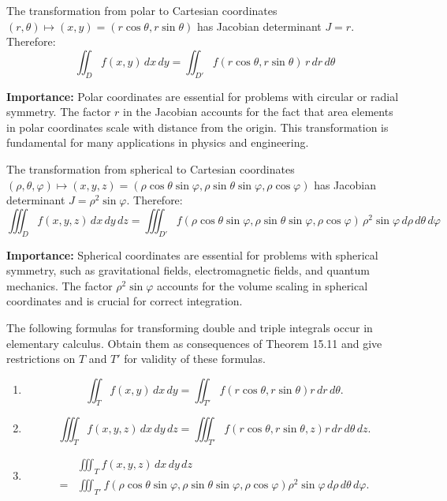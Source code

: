\begin{theorem}
The transformation from polar to Cartesian coordinates $(r, \theta) \mapsto (x, y) = (r\cos\theta, r\sin\theta)$ has Jacobian determinant $J = r$. Therefore:
\[\iint_D f(x, y) \, dx \, dy = \iint_{D'} f(r\cos\theta, r\sin\theta) \, r \, dr \, d\theta\]
\end{theorem}

\noindent\textbf{Importance:} Polar coordinates are essential for problems with circular or radial symmetry. The factor $r$ in the Jacobian accounts for the fact that area elements in polar coordinates scale with distance from the origin. This transformation is fundamental for many applications in physics and engineering.



\begin{theorem}
The transformation from spherical to Cartesian coordinates $(\rho, \theta, \varphi) \mapsto (x, y, z) = (\rho\cos\theta\sin\varphi, \rho\sin\theta\sin\varphi, \rho\cos\varphi)$ has Jacobian determinant $J = \rho^2\sin\varphi$. Therefore:
\[\iiint_D f(x, y, z) \, dx \, dy \, dz = \iiint_{D'} f(\rho\cos\theta\sin\varphi, \rho\sin\theta\sin\varphi, \rho\cos\varphi) \, \rho^2\sin\varphi \, d\rho \, d\theta \, d\varphi\]
\end{theorem}

\noindent\textbf{Importance:} Spherical coordinates are essential for problems with spherical symmetry, such as gravitational fields, electromagnetic fields, and quantum mechanics. The factor $\rho^2\sin\varphi$ accounts for the volume scaling in spherical coordinates and is crucial for correct integration.





\begin{problembox}
\begin{problemstatement}
The following formulas for transforming double and triple integrals occur in elementary calculus. Obtain them as consequences of Theorem 15.11 and give restrictions on \( T \) and \( T' \) for validity of these formulas.
\begin{enumerate}[label=(\alph*)]
\item \[ \iint_T f(x, y) \, dx \, dy = \iint_{T'} f(r \cos \theta, r \sin \theta)r \, dr \, d\theta.\]
\item \[ \iiint_T f(x, y, z) \, dx \, dy \, dz = \iiint_{T'} f(r \cos \theta, r \sin \theta, z)r \, dr \, d\theta \, dz.\]
\item 
\begin{align*}
&\iiint_T f(x, y, z) \, dx \, dy \, dz \\
=& \iiint_{T'} f(\rho \cos \theta \sin \varphi, \rho \sin \theta \sin \varphi, \rho \cos \varphi) \rho^2 \sin \varphi \, d\rho \, d\theta \, d\varphi.
\end{align*}
\end{enumerate}
\end{problemstatement}
\end{problembox}

